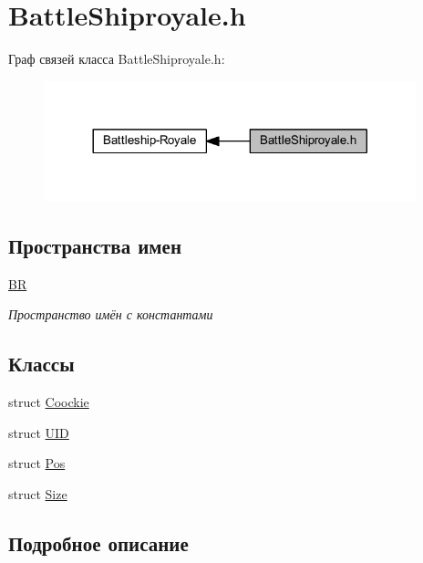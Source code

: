 \hypertarget{group__battleshiproyale}{}\section{Battle\+Shiproyale.\+h}
\label{group__battleshiproyale}
Граф связей класса Battle\+Shiproyale.\+h\+:\nopagebreak
\begin{figure}[H]
\begin{center}
\leavevmode
\includegraphics[width=305pt]{group__battleshiproyale}
\end{center}
\end{figure}
\subsection*{Пространства имен}
\begin{DoxyCompactItemize}
\item 
 \mbox{\hyperlink{namespace_b_r}{BR}}
\begin{DoxyCompactList}\small\item\em Пространство имён с константами \end{DoxyCompactList}\end{DoxyCompactItemize}
\subsection*{Классы}
\begin{DoxyCompactItemize}
\item 
struct \mbox{\hyperlink{struct_coockie}{Coockie}}
\item 
struct \mbox{\hyperlink{struct_u_i_d}{U\+ID}}
\item 
struct \mbox{\hyperlink{struct_pos}{Pos}}
\item 
struct \mbox{\hyperlink{struct_size}{Size}}
\end{DoxyCompactItemize}


\subsection{Подробное описание}
